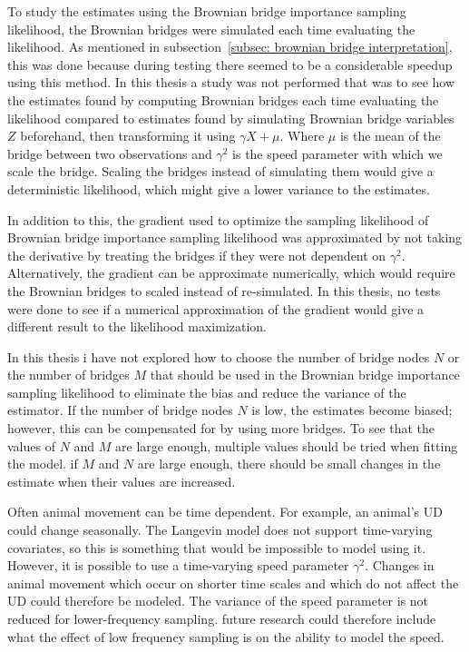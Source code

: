 To study the estimates using the Brownian bridge importance sampling likelihood, the Brownian bridges were simulated each time evaluating the likelihood. As mentioned in subsection~\ref{subsec: brownian bridge interpretation}, this was done because during testing there seemed to be a considerable speedup using this method. In this thesis a study was not performed that was to see how the estimates found by computing Brownian bridges each time evaluating the likelihood compared to estimates found by simulating Brownian bridge variables $Z$ beforehand, then transforming it using $\gamma X +\mu$. Where $\mu$ is the mean of the bridge between two observations and $\gamma^2$ is the speed parameter with which we scale the bridge. Scaling the bridges instead of simulating them would give a deterministic likelihood, which might give a lower variance to the estimates.


In addition to this, the gradient used to optimize the sampling likelihood of Brownian bridge importance sampling likelihood was approximated by not taking the derivative by treating the bridges if they were not dependent on $\gamma^2$. Alternatively, the gradient can be approximate numerically, which would require the Brownian bridges to scaled instead of re-simulated. In this thesis, no tests were done to see if a numerical approximation of the gradient would give a different result to the likelihood maximization.


In this thesis i have not explored how to choose the number of bridge nodes $N$ or the number of bridges $M$ that should be used in the Brownian bridge importance sampling likelihood to eliminate the bias and reduce the variance of the estimator. If the number of bridge nodes $N$ is low, the estimates become biased; however, this can be compensated for by using more bridges. To see that the values of $N$ and $M$ are large enough, multiple values should be tried when fitting the model. if $M$ and $N$ are large enough, there should be small changes in the estimate when their values are increased. 


Often animal movement can be time dependent. For example, an animal's UD could change seasonally. The Langevin model does not support time-varying covariates, so this is something that would be impossible to model using it. However, it is possible to use a time-varying speed parameter $\gamma^2$. Changes in animal movement which occur on shorter time scales and which do not affect the UD could therefore be modeled. The variance of the speed parameter is not reduced for lower-frequency sampling. future research could therefore include what the effect of low frequency sampling is on the ability to model the speed.



